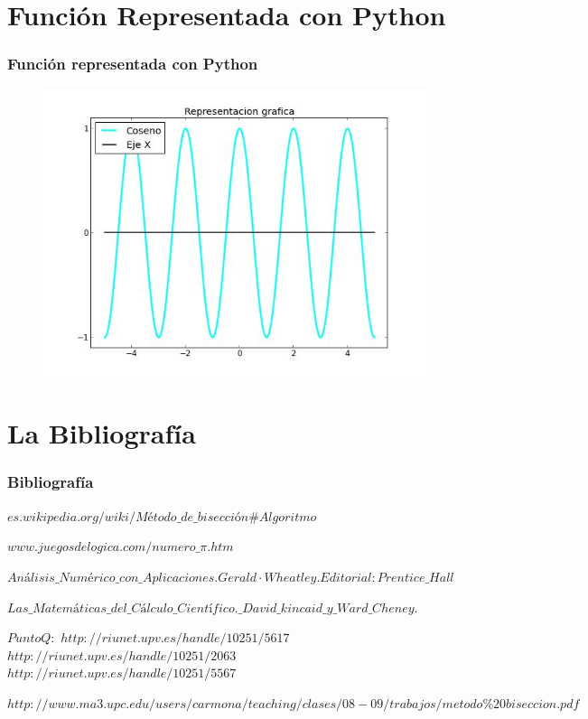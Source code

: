 \documentclass{beamer}
\begin{document}
\section{Función Representada con Python}
\begin{frame}
\frametitle{Función representada con Python}

\begin{figure}[b]
\begin{center}
\includegraphics[scale=0.5]{cos.jpeg}
\end{center}
\end{figure}
\end{frame}

\section{La Bibliografía}

\begin{frame}
\frametitle{Bibliografía}
\begin{thebibliography}
  \beamertermplatebookbibitems
  {\small $es.wikipedia.org/wiki/Método\_de\_bisección\#Algoritmo$}
  
  \beamertermplatebookbibitems
  {\small $www.juegosdelogica.com/numero\_\pi.htm$}
  
  \beamertermplatebookbibitems
  {\small $Análisis\_Numérico\_con\_Aplicaciones. Gerald·Wheatley. Editorial: Prentice\_Hall$}
  
  \beamertermplatebookbibitems
  {\small $Las\_Matemáticas\_del\_Cálculo\_Científico.\_David \_kincaid\_y\_Ward\_Cheney.$}
  
  \beamertermplatebookbibitems
  {\small $PuntoQ:$}
  {\small$http://riunet.upv.es/handle/10251/5617$}
  {\small$http://riunet.upv.es/handle/10251/2063$}
  {\small$http://riunet.upv.es/handle/10251/5567$}
  
  \beamertermplatebookbibitems
  {\small $http://www.ma3.upc.edu/users/carmona/teaching/clases/08-09/trabajos/metodo\%20biseccion.pdf$}
  
\end{thebibliography}
\end{frame}
\end{document}
